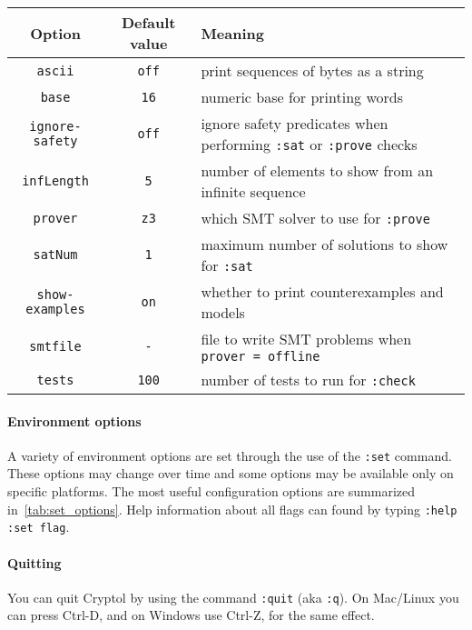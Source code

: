 
\begin{center}
  \begin{tabular*}{0.75\textwidth}[h]{c|c|l}
    \hline
     \textbf{Option}     & \textbf{Default value} & \textbf{Meaning}  \\
    \hline
     \texttt{ascii}           & \texttt{off}   & print sequences of bytes as a string \\
     \texttt{base}            & \texttt{16}    & numeric base for printing words  \\
     \texttt{ignore-safety}   & \texttt{off}   & ignore safety predicates when performing \texttt{:sat} or \texttt{:prove} checks \\
     \texttt{infLength}       & \texttt{5}     & number of elements to show from an infinite sequence \\
     \texttt{prover}          & \texttt{z3}    & which SMT solver to use for \texttt{:prove}  \\
     \texttt{satNum}          & \texttt{1}     & maximum number of solutions to show for \texttt{:sat} \\
     \texttt{show-examples}   & \texttt{on}    & whether to print counterexamples and models \\
     \texttt{smtfile}         & \texttt{-}     & file to write SMT problems when \texttt{prover = offline} \\
     \texttt{tests}           & \texttt{100}   & number of tests to run for \texttt{:check} \\
    \hline
  \end{tabular*}
  \label{tab:set_options}
\end{center}
\paragraph*{Environment options}
A variety of environment options are set through the use of the
\texttt{:set} command.  These options may change over time and some
options may be available only on specific platforms.  The most useful
configuration options are summarized in~\autoref{tab:set_options}.
Help information about all flags can found by typing {\tt :help :set flag}.


\paragraph*{Quitting}
You can quit Cryptol by using the command {\tt :quit} (aka
\texttt{:q}).  On Mac/Linux you can press Ctrl-D, and on Windows use
Ctrl-Z, for the same effect.\indCmdQuit

